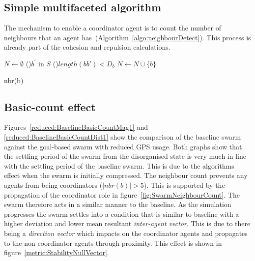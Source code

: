 \subsection{Simple multifaceted algorithm}
The mechanism to enable a coordinator agent is to count the number of neighbours that an agent has~(Algorithm~\ref{algo:neighbourDetect}). This process is already part of the cohesion and repulsion calculations.

\begin{algorithm}[H]
\DontPrintSemicolon
\SetAlgoLined
{}
$N \longleftarrow \emptyset$\;
\ForEach(){$b^{'}$ in $S$}
{
  \If(){$length(bb') < D_{b}$}
  {
     $N \longleftarrow N \cup \{b\}$
  }
}
\caption[Neighbour Detection]{nbr(b)}\label{algo:neighbourDetect}
\end{algorithm}

\subsection{Basic-count effect\label{section:compareBaselineBasicCount1}}
Figures~\ref{reduced:BaselineBasicCountMag1} and \ref{reduced:BaselineBasicCountDist1} show the comparison of the baseline swarm against the goal-based swarm with reduced GPS usage. Both graphs show that the settling period of the swarm from the disorganised state is very much in line with the settling period of the baseline swarm. This is due to the algorithms effect when the swarm is initially compressed. The neighbour count prevents any agents from being coordinators ($|nbr(b)| > 5$). This is supported by the propagation of the coordinator role in figure~\ref{fig:SwarmNeighbourCount}. The swarm therefore acts in a similar manner to the baseline. As the simulation progresses the swarm settles into a condition that is similar to baseline with a higher deviation and lower mean resultant \textit{inter-agent vector}. This is due to there being a \textit{direction vector} which impacts on the coordinator agents and propagates to the non-coordinator agents through proximity. This effect is shown in figure~\ref{metric:StabilityNullVector}. 

